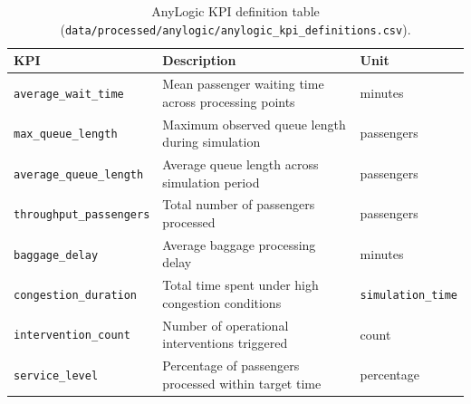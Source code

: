 \begin{table}[H]
  \centering
  \renewcommand{\arraystretch}{1.25}
  \caption[AnyLogic KPI definitions]{AnyLogic KPI definition table (\texttt{data/\allowbreak processed/\allowbreak anylogic/\allowbreak anylogic\_kpi\_definitions.csv}).}
  \label{tab:anylogic-kpi-definitions}
  \begin{tabularx}{\textwidth}{|l|X|l|}
    \hline
    \textbf{KPI} & \textbf{Description} & \textbf{Unit} \\
    \hline
    \nolinkurl{average_wait_time} & Mean passenger waiting time across processing points & minutes \\
    \hline
    \nolinkurl{max_queue_length} & Maximum observed queue length during simulation & passengers \\
    \hline
    \nolinkurl{average_queue_length} & Average queue length across simulation period & passengers \\
    \hline
    \nolinkurl{throughput_passengers} & Total number of passengers processed & passengers \\
    \hline
    \nolinkurl{baggage_delay} & Average baggage processing delay & minutes \\
    \hline
    \nolinkurl{congestion_duration} & Total time spent under high congestion conditions & \nolinkurl{simulation_time} \\
    \hline
    \nolinkurl{intervention_count} & Number of operational interventions triggered & count \\
    \hline
    \nolinkurl{service_level} & Percentage of passengers processed within target time & percentage \\
    \hline
  \end{tabularx}
\end{table}

